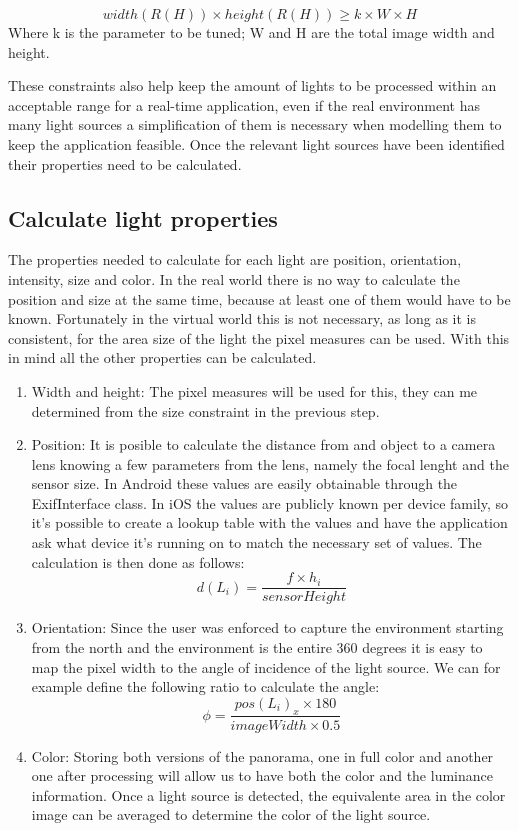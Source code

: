 \documentclass{article}
\begin{document}
\[
    width(R(H)) \times height(R(H)) \geq k \times W \times H
\]
Where k is the parameter to be tuned; W and H are the total image width and height.\newline

These constraints also help keep the amount of lights to be processed within an acceptable range for a real-time application, even if the real environment has many light sources a simplification of them is necessary when modelling them to keep the application feasible. Once the relevant light sources have been identified their properties need to be calculated.

\subsection{Calculate light properties}
The properties needed to calculate for each light are position, orientation, intensity, size and color. In the real world there is no way to calculate the position and size at the same time, because at least one of them would have to be known. Fortunately in the virtual world this is not necessary, as long as it is consistent, for the area size of the light the pixel measures can be used. With this in mind all the other properties can be calculated.

\begin{enumerate}
\item Width and height: The pixel measures will be used for this, they can me determined from the size constraint in the previous step.
\item Position: It is posible to calculate the distance from and object to a camera lens knowing a few parameters from the lens, namely the focal lenght and the sensor size. In Android these values are easily obtainable through the ExifInterface class. In iOS the values are publicly known per device family, so it's possible to create a lookup table with the values and have the application ask what device it's running on to match the necessary set of values. The calculation is then done as follows:
\[
    d(L_i) = \frac{ f \times h_i}{sensorHeight}
\]
\item  Orientation: Since the user was enforced to capture the environment starting from the north and the environment is the entire 360 degrees it is easy to map the pixel width to the angle of incidence of the light source. We can for example define the following ratio to calculate the angle:
\[
    \phi = \frac{pos(L_i)_x \times 180}{imageWidth \times 0.5}
\]
\item Color: Storing both versions of the panorama, one in full color and another one after processing will allow us to have both the color and the luminance information. Once a light source is detected, the equivalente area in the color image can be averaged to determine the color of the light source.
\end{enumerate}
\end{document}
